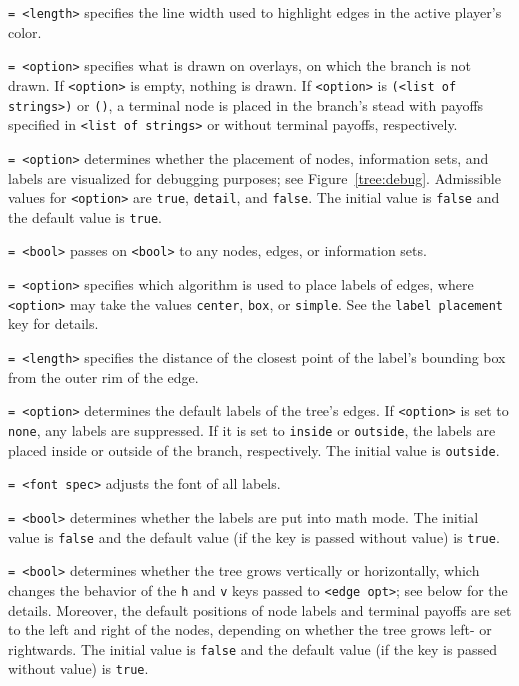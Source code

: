 \documentclass{article}
\newenvironment{desc}{\itemize[leftmargin=50pt]}{\enditemize}
\def\option#1#2{\item[\texttt{#1}] \hskip-1.5pt\texttt{#2}}
\begin{document}
\begin{desc}
\option{alert width}{= <length>} specifies the line width used to highlight edges in the active player's color.

\option{alt}{= <option>} specifies what is drawn on overlays, on which the branch is not drawn. If \texttt{<option>} is empty, nothing is drawn. If \texttt{<option>} is \texttt{(<list of strings>)} or \texttt{()}, a terminal node is placed in the branch's stead with payoffs specified in \texttt{<list of strings>} or without terminal payoffs, respectively.

\option{debug}{= <option>} determines whether the placement of nodes, information sets, and labels are visualized for debugging purposes; see Figure~\ref{tree:debug}. Admissible values for \texttt{<option>} are \texttt{true}, \texttt{detail}, and \texttt{false}. The initial value is \texttt{false} and the default value is \texttt{true}.

\option{delay contour}{= <bool>} passes on \texttt{<bool>} to any nodes, edges, or information sets.

\option{edge label placement}{= <option>} specifies which algorithm is used to place labels of edges, where \texttt{<option>} may take the values \texttt{center}, \texttt{box}, or \texttt{simple}. See the \texttt{label placement} key for details.

\option{edge label sep}{= <length>} specifies the distance of the closest point of the label's bounding box from the outer rim of the edge.

\option{edge labels}{= <option>} determines the default labels of the tree's edges. If \texttt{<option>} is set to \texttt{none}, any labels are suppressed. If it is set to \texttt{inside} or \texttt{outside}, the labels are placed inside or outside of the branch, respectively. The initial value is \texttt{outside}.

\option{font}{= <font spec>} adjusts the font of all labels.

\option{force math}{= <bool>} determines whether the labels are put into math mode. The initial value is \texttt{false} and the default value (if the key is passed without value) is \texttt{true}. %

\option{horizontal}{= <bool>} determines whether the tree grows vertically or horizontally, which changes the behavior of the \texttt{h} and \texttt{v} keys passed to \texttt{<edge opt>}; see below for the details. Moreover, the default positions of node labels and terminal payoffs are set to the left and right of the nodes, depending on whether the tree grows left- or rightwards. The initial value is \texttt{false} and the default value (if the key is passed without value) is \texttt{true}.


\end{desc}
\end{document}
